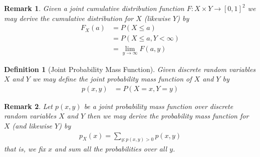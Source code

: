 \documentclass[11pt, oneside]{book}   	%
\newtheorem{definition}{Definition}[chapter]
\newtheorem{remark}{Remark}[chapter]
\newcommand{\paren}[1]{\left(#1\right)}
\begin{document}
\begin{spacing}{1.618}
\begin{remark}
	Given a joint cumulative distribution function $F:X\times Y\to [0,1]^2$ we may derive the cumulative distribution for $X$ (likewise $Y$) by 
	\begin{alignat}{4}
		F_X(a)&=P\paren{X\leq a} \\
			&=P\paren{X\leq a, Y<\infty} \\
			&=\lim_{y\to\infty}F(a, y)
	\end{alignat}
\end{remark}

\begin{definition}[Joint Probability Mass Function]
	Given discrete random variables $X$ and $Y$ we may define the \emph{joint probability mass function} of $X$ and $Y$ by 
	\begin{alignat}{4}
		p(x, y)&=P\paren{X=x, Y=y}
	\end{alignat}
\end{definition}

\begin{remark}
	Let $p(x, y)$ be a joint probability mass function over discrete random variables $X$ and $Y$ then we may derive the probability mass function for $X$ (and likewise $Y$) by 
	\begin{alignat}{4}
		p_X(x)=\sum_{y:p(x, y)>0} p(x, y)
	\end{alignat}
	that is, we fix $x$ and sum all the probabilities over all $y$. 
\end{remark}



\end{spacing}

\clearpage
{}
\printindex
\end{document}
